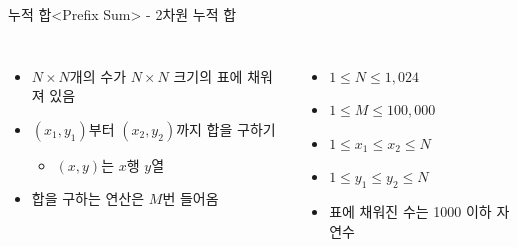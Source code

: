 \begin{frame}{누적 합}{<Prefix Sum> - 2차원 누적 합}
  \begin{center}
  \end{center}
  \vspace{4mm}
  \begin{columns}[T]
      \begin{itemize}
        \item $N{\times}N$개의 수가 $N{\times}N$ 크기의 표에 채워져 있음
        \item $(x_1, y_1)$부터 $(x_2, y_2)$까지 합을 구하기
        \begin{itemize}
          \item $(x, y)$는 $x$행 $y$열
        \end{itemize}
        \item 합을 구하는 연산은 $M$번 들어옴
      \end{itemize}
      \begin{itemize}
        \item $1 \le N \le 1{,}024$
        \item $1 \le M \le 100{,}000$
        \item $1 \le x_1 \le x_2 \le N$
        \item $1 \le y_1 \le y_2 \le N$
        \item 표에 채워진 수는 1000 이하 자연수
      \end{itemize}
  \end{columns}
\end{frame}

